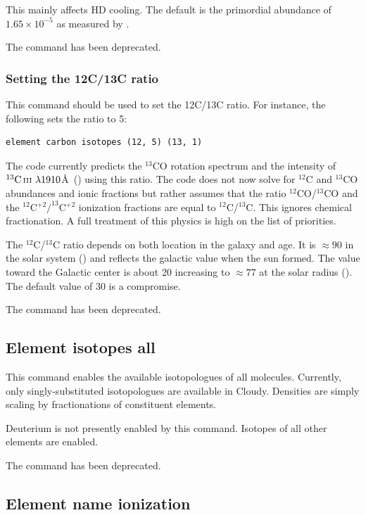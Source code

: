This mainly affects HD cooling.
The default is the primordial abundance of $1.65 \times 10^{-5}$
as measured by \citet{Pettini2001}.

The command  has been deprecated.

\subsubsection{Setting the 12C/13C ratio}

This command should be used to set the 12C/13C ratio.
For instance, the following sets the ratio to 5:
%
\begin{verbatim}
element carbon isotopes (12, 5) (13, 1)
\end{verbatim}
%

The code currently predicts the $^{13}$CO rotation spectrum
and the intensity of
$^{13}\mbox{{\ensuremath{\mathrm{C\,\scriptstyle III}}}}\ \lambda 1910$\AA\ (\citealp{Clegg1997}) using this ratio.
The code does not now solve
for $^{12}$C and $^{13}$CO abundances and ionic fractions
but rather assumes that
the ratio $^{12}$CO/$^{13}$CO and the
$^{12}$C$^{+2}/^{13}$C$^{+2}$ ionization fractions are equal to
$^{12}$C/$^{13}$C.
This ignores chemical fractionation.
A full treatment of this physics is high on the list of priorities.

The $^{12}$C/$^{13}$C ratio depends on both location in the
galaxy and age.
It is $\approx 90$ in the solar system (\citealp{Asplund2009})
and reflects the galactic value when the sun formed.
The value toward the Galactic center
is about 20 increasing to $\approx77$ at the solar radius
(\citealp{Wilson1994}).
The default value of 30 is a compromise.

The command  has been deprecated.

\subsection{Element isotopes all}

This command enables the available isotopologues of all molecules.
Currently, only singly-substituted isotopologues are available in
Cloudy.
Densities are simply scaling by fractionations of constituent elements.

Deuterium is not presently enabled by this command.
Isotopes of all other elements are enabled.

The command  has been deprecated.

\subsection{Element name ionization }

